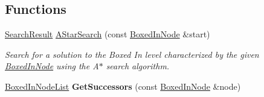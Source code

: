 \subsection*{Functions}
\begin{DoxyCompactItemize}
\item 
\hyperlink{classboxedin_1_1SearchResult}{Search\+Result} \hyperlink{namespaceboxedin_ab45bd3ce2fbf569ccb8404439052e0d1}{A\+Star\+Search} (const \hyperlink{classboxedin_1_1BoxedInNode}{Boxed\+In\+Node} \&start)
\begin{DoxyCompactList}\small\item\em Search for a solution to the Boxed In level characterized by the given \hyperlink{classboxedin_1_1BoxedInNode}{Boxed\+In\+Node} using the A$\ast$ search algorithm. \end{DoxyCompactList}\item 
\hypertarget{namespaceboxedin_ab1e7cd6ae4e909fcd5c7f7fb33bee364}{\hyperlink{namespaceboxedin_a01412e7e38b44e8ce2d9f0d67d142219}{Boxed\+In\+Node\+List} {\bfseries Get\+Successors} (const \hyperlink{classboxedin_1_1BoxedInNode}{Boxed\+In\+Node} \&node)}\label{namespaceboxedin_ab1e7cd6ae4e909fcd5c7f7fb33bee364}


\end{DoxyCompactItemize}
